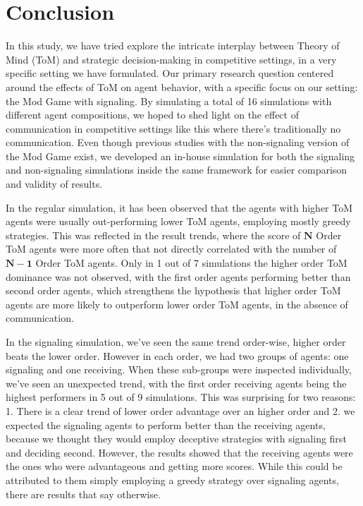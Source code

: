 \section{Conclusion}\label{sec:conclusion}

In this study, we have tried explore the intricate interplay between Theory of Mind (ToM) and strategic decision-making in competitive settings, in a very specific setting we have formulated. Our primary research question centered around the effects of ToM on agent behavior, with a specific focus on our setting:  the Mod Game with signaling. By simulating a total of 16 simulations with different agent compositions, we hoped to shed light on the effect of communication in competitive settings like this where there's traditionally no communication. Even though previous studies with the non-signaling version of the Mod Game exist, we developed an in-house simulation for both the signaling and non-signaling simulations inside the same framework for easier comparison and validity of results.

In the regular simulation, it has been observed that the agents with higher ToM agents were usually out-performing lower ToM agents, employing mostly greedy strategies. This was reflected in the result trends, where the score of $\mathbf{N}$ Order ToM agents were more often that not directly correlated with the number of $\mathbf{N-1}$ Order ToM agents. Only in 1 out of 7 simulations the higher order ToM dominance was not observed, with the first order agents performing better than second order agents, which strengthens the hypothesis that higher order ToM agents are more likely to outperform lower order ToM agents, in the absence of communication.

In the signaling simulation, we've seen the same trend order-wise, higher order beats the lower order. However in each order, we had two groups of agents: one signaling and one receiving. When these sub-groups were inspected individually, we've seen an unexpected trend, with the first order receiving agents being the highest performers in 5 out of 9 simulations. This was surprising for two reasons: 1. There is a clear trend of lower order advantage over an higher order and 2. we expected the signaling agents to perform better than the receiving agents, because we thought they would employ deceptive strategies with signaling first and deciding second. However, the results showed that the receiving agents were the ones who were advantageous and getting more scores. While this could be attributed to them simply employing a greedy strategy over signaling agents, there are results that say otherwise. 

